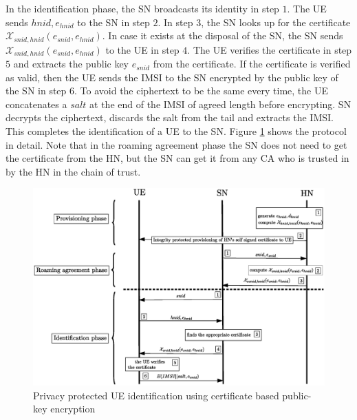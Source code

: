 \documentclass[12pt]{llncs}
\begin{document}
In the identification phase, the SN broadcasts its identity in step $1$. The UE sends $hnid,e_{hnid}$ to the SN in step $2$. In step $3$, the SN looks up for the certificate $\mathcal{X}_{snid,hnid} (e_{snid},e_{hnid})$. In case it exists at the disposal of the SN, the SN sends $\mathcal{X}_{snid,hnid} (e_{snid},e_{hnid})$ to the UE in step $4$. The UE verifies the certificate in step $5$ and extracts the public key $e_{snid}$ from the certificate. If the certificate is verified as valid, then the UE sends the IMSI to the SN encrypted by the public key of the SN in step $6$. To avoid the ciphertext to be the same every time, the UE concatenates a $salt$ at the end of the IMSI of agreed length before encrypting. SN decrypts the ciphertext, discards the salt from the tail and extracts the IMSI. This completes the identification of a UE to the SN. Figure \ref{fig:solution_certificate} shows the protocol in detail. Note that in the roaming agreement phase the SN does not need to get the certificate from the HN, but the SN can get it from any CA who is trusted in by the HN in the chain of trust.
\begin{figure}
\begin{center}
  \includegraphics[width=.98\textwidth]{public_key_variation1.eps}
\caption{Privacy protected UE identification using certificate based public-key encryption}
\label{fig:solution_certificate}       %
\end{center}
\end{figure}
\end{document}
